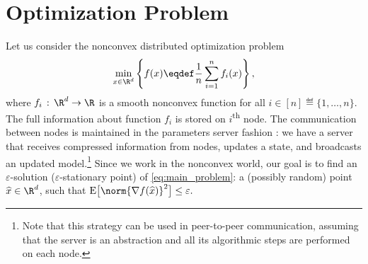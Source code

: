 \documentclass{article}
\begin{document}

\section{Optimization Problem}
\label{sec:opt_problem}
Let us consider the nonconvex distributed optimization problem
\begin{align}
    \label{eq:main_problem} 
    \min \limits_{x \in \R^d}\left\{f(x) \eqdef \frac{1}{n}\sum \limits_{i=1}^n f_i(x)\right\},
\end{align}
where $f_i\,:\,\R^d \rightarrow \R$ is a smooth nonconvex function for all $i \in [n] \eqdef \{1, \dots, n\}.$ The full information about function $f_i$ is stored on $i$\textsuperscript{th} node. The communication between nodes is maintained in the parameters server fashion \citep{kairouz2021advances}: we have a server that receives compressed information from nodes, updates a state, and broadcasts an updated model.\footnote{Note that this strategy can be used in peer-to-peer communication, assuming that the server is an abstraction and all its algorithmic steps are performed on each node.} Since we work in the nonconvex world, our goal is to find an $\varepsilon$-solution ($\varepsilon$-stationary point) of \eqref{eq:main_problem}: a (possibly random) point $\widehat{x}\in \R^d$, such that ${\rm E}\big[\norm{\nabla f(\widehat{x})}^2\big] \leq \varepsilon.$
\end{document}
